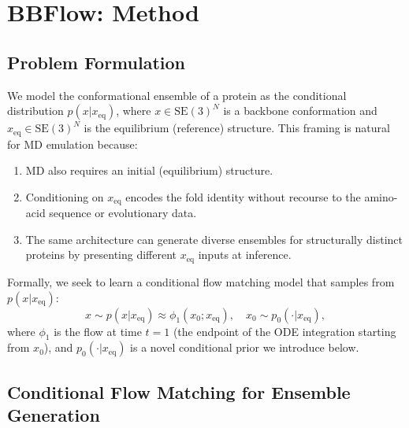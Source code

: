 \documentclass[12pt,a4paper]{article}
\newcommand{\xeq}{x_{\mathrm{eq}}}
\newcommand{\SE}{\mathrm{SE}(3)}
\begin{document}
\section{BBFlow: Method}
\label{sec:method}

\subsection{Problem Formulation}
\label{sec:formulation}

We model the conformational ensemble of a protein as the conditional distribution
$p(x | \xeq)$, where $x \in \SE^N$ is a backbone conformation and $\xeq \in \SE^N$ is
the equilibrium (reference) structure.  This framing is natural for MD emulation because:
\begin{enumerate}
  \item MD also requires an initial (equilibrium) structure.
  \item Conditioning on $\xeq$ encodes the fold identity without recourse to the amino-acid
    sequence or evolutionary data.
  \item The same architecture can generate diverse ensembles for structurally distinct proteins
    by presenting different $\xeq$ inputs at inference.
\end{enumerate}

Formally, we seek to learn a conditional flow matching model that samples from $p(x|\xeq)$:
\begin{equation}
  \label{eq:problem}
  x \sim p(x | \xeq) \approx \phi_1(x_0; \xeq), \quad x_0 \sim p_0(\cdot | \xeq),
\end{equation}
where $\phi_1$ is the flow at time $t=1$ (the endpoint of the ODE integration starting
from $x_0$), and $p_0(\cdot|\xeq)$ is a novel conditional prior we introduce below.

\subsection{Conditional Flow Matching for Ensemble Generation}
\label{sec:conditional_fm}
\end{document}
